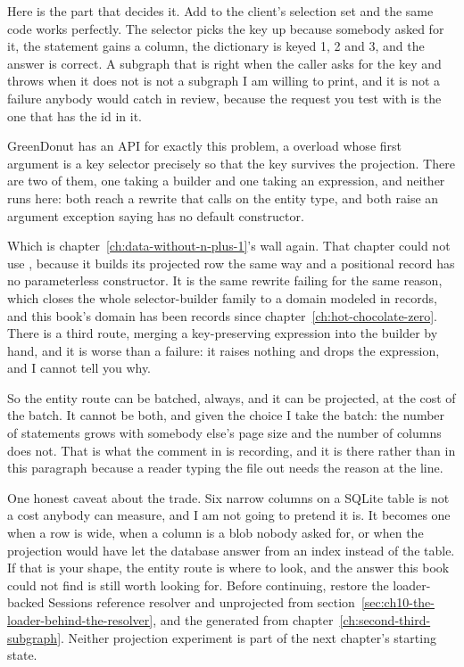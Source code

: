 %
Here is the part that decides it. Add  to the client's selection set
and the same code works perfectly. The selector picks the key up because
somebody asked for it, the statement gains a column, the dictionary is keyed 1,
2 and 3, and the answer is correct. A subgraph that is right when the caller
asks for the key and throws when it does not is not a subgraph I am willing to
print, and it is not a failure anybody would catch in review, because the
request you test with is the one that has the id in it.

%
GreenDonut has an API for exactly this problem, a  overload whose
first argument is a key selector precisely so that the key survives the
projection. There are two of them, one taking a builder and one taking an
expression, and neither runs here: both reach a rewrite that calls
 on the entity type, and both raise an argument exception
saying  has no default constructor.

%
Which is chapter~\ref{ch:data-without-n-plus-1}'s wall again. That chapter could
not use \code{[UseProjection]}, because it builds its projected row the same
way and a positional record has no parameterless constructor. It is the same
rewrite failing for the same reason, which closes the whole selector-builder
family to a domain modeled in records, and this book's domain has been records
since chapter~\ref{ch:hot-chocolate-zero}. There is a third route, merging a
key-preserving expression into the builder by hand, and it is worse than a
failure: it raises nothing and drops the expression, and I cannot tell you why.

%
So the entity route can be batched, always, and it can be projected, at the cost
of the batch. It cannot be both, and given the choice I take the batch: the
number of statements grows with somebody else's page size and the number of
columns does not. That is what the comment in  is
recording, and it is there rather than in this paragraph because a reader typing
the file out needs the reason at the line.

%
One honest caveat about the trade. Six narrow columns on a SQLite table is not a
cost anybody can measure, and I am not going to pretend it is. It becomes one
when a row is wide, when a column is a blob nobody asked for, or when the
projection would have let the database answer from an index instead of the
table. If that is your shape, the entity route is where to look, and the answer
this book could not find is still worth looking for.
Before continuing, restore the loader-backed Sessions reference resolver and
unprojected  from
section~\ref{sec:ch10-the-loader-behind-the-resolver}, and the generated
 from chapter~\ref{ch:second-third-subgraph}.
Neither projection experiment is part of the next chapter's starting state.
%
%
